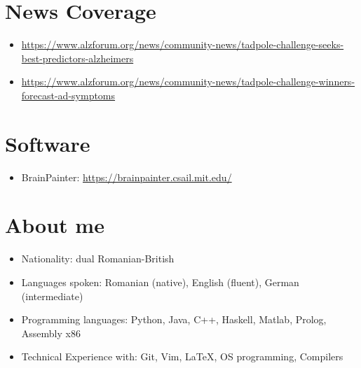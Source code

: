 \documentclass[a4paper,10pt]{article} %
\begin{document}
\section*{News Coverage}
\begin{itemize}
 \item \url{https://www.alzforum.org/news/community-news/tadpole-challenge-seeks-best-predictors-alzheimers}
 \item \url{https://www.alzforum.org/news/community-news/tadpole-challenge-winners-forecast-ad-symptoms}
\end{itemize}


\section*{Software}
\begin{itemize}
 \item BrainPainter: \url{https://brainpainter.csail.mit.edu/}
\end{itemize}

\section*{About me}
\begin{itemize}
 \item Nationality: dual Romanian-British
 \item Languages spoken: Romanian (native), English (fluent), German (intermediate)
 \item Programming languages: Python, Java, C++, Haskell, Matlab, Prolog, Assembly x86
 \item Technical Experience with: Git, Vim, \LaTeX, OS programming, Compilers
\end{itemize}




\end{document}
